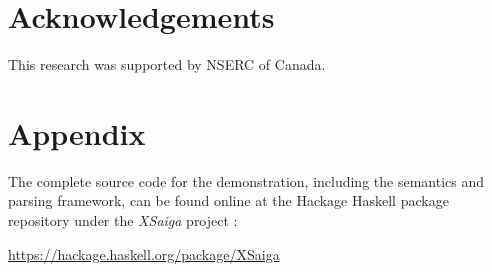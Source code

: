 \documentclass[../main.tex]{subfiles}
\begin{document}
\begin{refsection}
\section*{Acknowledgements}

\noindent This research was supported by NSERC of Canada.

%


\section*{Appendix}

\noindent The complete source code for the demonstration, including the semantics and parsing framework, can be found online at the Hackage Haskell package repository under the \textit{XSaiga} project \cite{xsaiga}:

\begin{center}
	\url{https://hackage.haskell.org/package/XSaiga}
\end{center}

\printbibliography[heading=subbibintoc]

\end{refsection}
\end{document}

